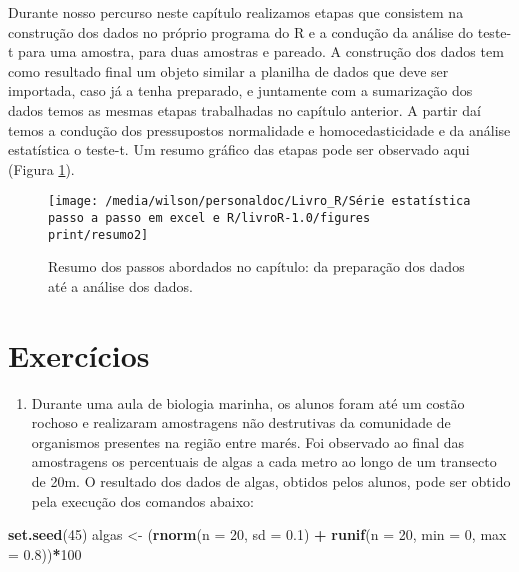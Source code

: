 \documentclass[14pt,titlepage, oneside, openany, a4paper]{book}
\newenvironment{Shaded}{\begin{snugshade}}{\end{snugshade}}
\newcommand{\DataTypeTok}[1]{\textcolor[rgb]{0.13,0.29,0.53}{#1}}
\newcommand{\DecValTok}[1]{\textcolor[rgb]{0.00,0.00,0.81}{#1}}
\newcommand{\FloatTok}[1]{\textcolor[rgb]{0.00,0.00,0.81}{#1}}
\newcommand{\KeywordTok}[1]{\textcolor[rgb]{0.13,0.29,0.53}{\textbf{#1}}}
\newcommand{\NormalTok}[1]{#1}
\newcommand{\OperatorTok}[1]{\textcolor[rgb]{0.81,0.36,0.00}{\textbf{#1}}}
\newcommand{\StringTok}[1]{\textcolor[rgb]{0.31,0.60,0.02}{#1}}
\providecommand{\tightlist}{%
  \setlength{\itemsep}{0pt}\setlength{\parskip}{0pt}}
\begin{document}
Durante nosso percurso neste capítulo realizamos etapas que consistem na construção dos dados no próprio programa do R e a condução da análise do teste-t para uma amostra, para duas amostras e pareado. A construção dos dados tem como resultado final um objeto similar a planilha de dados que deve ser importada, caso já a tenha preparado, e juntamente com a sumarização dos dados temos as mesmas etapas trabalhadas no capítulo anterior. A partir daí temos a condução dos pressupostos normalidade e homocedasticidade e da análise estatística o teste-t. Um resumo gráfico das etapas pode ser observado aqui (Figura \ref{fig:resumo3}).

\begin{figure}[H]

{\centering \texttt{[image: /media/wilson/personaldoc/Livro\_R/Série estatística passo a passo em excel e R/livroR-1.0/figures print/resumo2]} 

}

\caption{Resumo dos passos abordados no capítulo: da preparação dos dados até a análise dos dados.}\label{fig:resumo3}
\end{figure}

\hypertarget{exercuxedcios-3}{%
\section{Exercícios}\label{exercuxedcios-3}}

\begin{enumerate}
\def\labelenumi{\arabic{enumi})}
\tightlist
\item
  Durante uma aula de biologia marinha, os alunos foram até um costão rochoso e realizaram amostragens não destrutivas da comunidade de organismos presentes na região entre marés. Foi observado ao final das amostragens os percentuais de algas a cada metro ao longo de um transecto de 20m.
  O resultado dos dados de algas, obtidos pelos alunos, pode ser obtido pela execução dos comandos abaixo:
\end{enumerate}

\begin{Shaded}
\begin{Highlighting}[]
\KeywordTok{set.seed}\NormalTok{(}\DecValTok{45}\NormalTok{)}
\NormalTok{algas <-}\StringTok{ }\NormalTok{(}\KeywordTok{rnorm}\NormalTok{(}\DataTypeTok{n =} \DecValTok{20}\NormalTok{, }\DataTypeTok{sd =} \FloatTok{0.1}\NormalTok{) }\OperatorTok{+}\StringTok{ }\KeywordTok{runif}\NormalTok{(}\DataTypeTok{n =} \DecValTok{20}\NormalTok{, }\DataTypeTok{min =} \DecValTok{0}\NormalTok{, }\DataTypeTok{max =} \FloatTok{0.8}\NormalTok{))}\OperatorTok{*}\DecValTok{100}
\end{Highlighting}
\end{Shaded}
\end{document}
